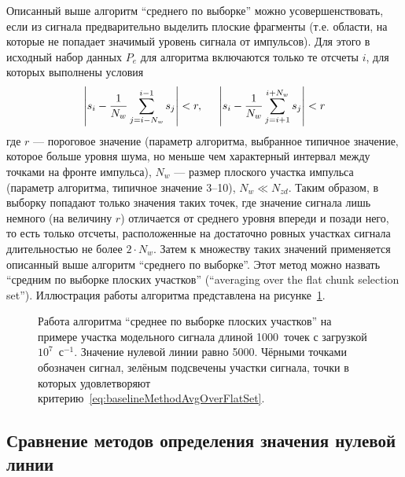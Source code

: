 Описанный выше алгоритм ``среднего по выборке'' можно усовершенствовать, если из сигнала предварительно выделить плоские фрагменты (т.е. области, на которые не попадает значимый уровень сигнала от импульсов). Для этого в исходный набор данных $P_e$ для алгоритма включаются только те отсчеты $i$, для которых выполнены условия
\begin{equation}
  \label{eq:baselineMethodAvgOverFlatSet}
  \left|  s_i - \frac{1}{N_w} \sum \limits_{j=i-N_w}^{i-1} s_j  \right| < r, \hspace{5mm}
  \left|  s_i - \frac{1}{N_w} \sum \limits_{j=i+1}^{i+N_w} s_j  \right| < r 
\end{equation}
где $r$ --- пороговое значение (параметр алгоритма, выбранное типичное значение, которое больше уровня шума, но меньше чем характерный интервал между точками на фронте импульса), $N_w$ --- размер плоского участка импульса (параметр алгоритма, типичное значение 3--10), $N_w \ll N_{zd}$. Таким образом, в выборку попадают только значения таких точек, где значение сигнала лишь немного (на величину $r$) отличается от среднего уровня впереди и позади него, то есть только отсчеты, расположенные на достаточно ровных участках сигнала длительностью не более $2 \cdot N_w$. Затем к множеству таких значений применяется описанный выше алгоритм ``среднего по выборке''. Этот метод можно назвать ``средним по выборке плоских участков'' (``averaging over the flat chunk selection set''). Иллюстрация работы алгоритма представлена на рисунке~\ref{fig:baselineMethodAvgOverFlatSet}.~\cite{Khilkevitch2020}

\begin{figure}[ht!!]
  \caption{ Работа алгоритма ``среднее по выборке плоских участков'' на примере участка модельного сигнала длиной 1000~точек с загрузкой $10^7$~с${}^{-1}$. Значение нулевой линии равно 5000. Чёрными точками обозначен сигнал, зелёным подсвечены участки сигнала, точки в которых удовлетворяют критерию~\ref{eq:baselineMethodAvgOverFlatSet}.~\cite{Khilkevitch2020}}
  \label{fig:baselineMethodAvgOverFlatSet}
\end{figure}


\FloatBarrier
\subsection{Сравнение методов определения значения нулевой линии}

